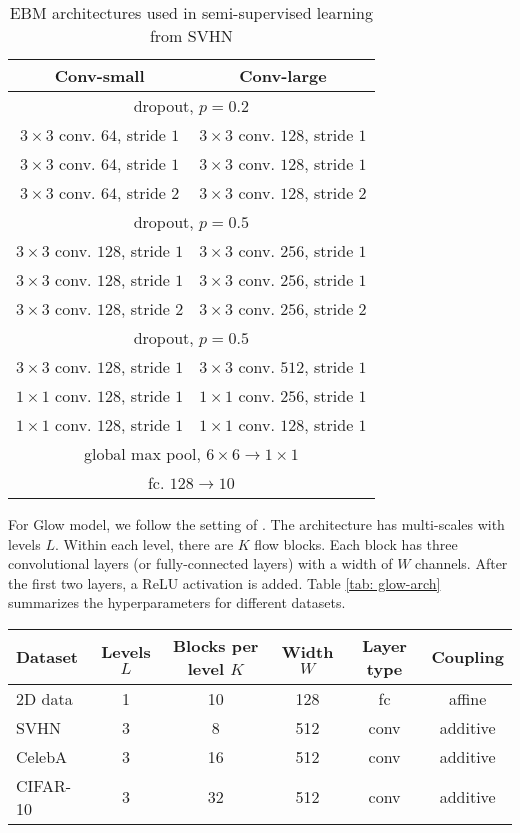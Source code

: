 \documentclass[10pt,twocolumn,letterpaper]{article}
\begin{document}
\begin{table}[h]
	\centering
	\caption{EBM architectures used in semi-supervised learning from SVHN}
	\label{tab: ebm-semi-arch}
	\begin{tabular}{cc}
		\toprule
		Conv-small & Conv-large  \\
		\midrule 
		\multicolumn{2}{c}{dropout, $p=0.2$}\\
		\midrule
		$3\times3$ conv. $64$, stride $1$ & $3\times3$ conv. $128$, stride $1$  \\
		$3\times3$ conv. $64$, stride $1$ & $3\times3$ conv. $128$, stride $1$  \\
		$3\times3$ conv. $64$, stride $2$ & $3\times3$ conv. $128$, stride $2$  \\
		\midrule
		\multicolumn{2}{c}{dropout, $p=0.5$}\\
		\midrule
		$3\times3$ conv. $128$, stride $1$ & $3\times3$ conv. $256$, stride $1$  \\
		$3\times3$ conv. $128$, stride $1$ & $3\times3$ conv. $256$, stride $1$  \\
		$3\times3$ conv. $128$, stride $2$ & $3\times3$ conv. $256$, stride $2$  \\
		\midrule
		\multicolumn{2}{c}{dropout, $p=0.5$}\\
		\midrule
		$3\times3$ conv. $128$, stride $1$ & $3\times3$ conv. $512$, stride $1$  \\
		$1\times1$ conv. $128$, stride $1$ & $1\times1$ conv. $256$, stride $1$  \\
		$1\times1$ conv. $128$, stride $1$ & $1\times1$ conv. $128$, stride $1$  \\
		\midrule
		\multicolumn{2}{c}{global max pool, $6\times6 \rightarrow 1\times1$}\\
		\multicolumn{2}{c}{fc. $128 \rightarrow 10$}\\
		\bottomrule
	\end{tabular}
\end{table}

For Glow model, we follow the setting of \cite{kingma2018Glow}. The architecture has multi-scales with levels $L$. Within each level, there are $K$ flow blocks. Each block has three convolutional layers (or fully-connected layers) with a width of $W$ channels. After the first two layers, a ReLU activation is added. Table \ref{tab: glow-arch} summarizes the hyperparameters for different datasets. 

\begin{table*}[h]
	\centering
	\caption{Hyperparameters for Glow model architectures}
	\label{tab: glow-arch}
	\begin{tabular}{lccccc}
		\toprule
		Dataset & Levels $L$ & Blocks per level $K$ & Width $W$ & Layer type & Coupling\\
		\midrule 
		2D data & 1 & 10 & 128 & fc & affine \\
		SVHN & 3 & 8 & 512 & conv & additive \\
		CelebA & 3 & 16 & 512 & conv & additive \\
		CIFAR-10 & 3 & 32 & 512 & conv & additive \\
		\bottomrule
	\end{tabular}
\end{table*}
\end{document}
